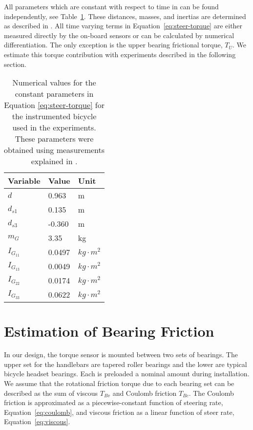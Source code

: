 \documentclass[10pt]{article}
\begin{document}
All parameters which are constant with respect to time in can be found
independently, see Table~\ref{tab:numerical-constants}. These distances,
masses, and inertias are determined as described in \cite{Moore2012}. All time
varying terms in Equation~\ref{eq:steer-torque} are either measured directly by
the on-board sensors or can be calculated by numerical differentiation. The
only exception is the upper bearing frictional torque, $T_U$. We estimate this
torque contribution with experiments described in the following section.

\begin{table}
  \centering
  \caption{Numerical values for the constant parameters in Equation
    \ref{eq:steer-torque} for the instrumented bicycle used in the experiments.
    These parameters were obtained using measurements explained in
    \cite{Moore2012}.}
  \begin{tabular}{lll}
    \toprule
    Variable     & Value  & Unit \\
    \midrule
    $d$          & 0.963  & m\\
    $d_{s1}$     & 0.135  & m \\
    $d_{s3}$     & -0.360 & m \\
    $m_G$        & 3.35   & kg \\
    $I_{G_{11}}$ & 0.0497 & $kg \cdot m^2$ \\
    $I_{G_{13}}$ & 0.0049 & $kg \cdot m^2$ \\
    $I_{G_{22}}$ & 0.0174 & $kg \cdot m^2$ \\
    $I_{G_{33}}$ & 0.0622 & $kg \cdot m^2$ \\
    \bottomrule
  \end{tabular}
  \label{tab:numerical-constants}
\end{table}

\section*{Estimation of Bearing Friction}
\label{sec:bearing-friction}

In our design, the torque sensor is mounted between two sets of bearings. The
upper set for the handlebars are tapered roller bearings and the lower are
typical bicycle headset bearings. Each is preloaded a nominal amount during
installation. We assume that the rotational friction torque due to each bearing
set can be described as the sum of viscous $T_{Bv}$ and Coulomb friction
$T_{Bc}$. The Coulomb friction is approximated as a piecewise-constant function
of steering rate, Equation~\ref{eq:coulomb}, and viscous friction as a linear
function of steer rate, Equation~\ref{eq:viscous}.
\end{document}
